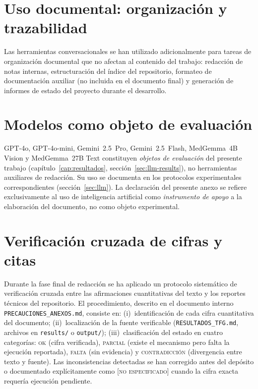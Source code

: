 \section{Uso documental: organización y trazabilidad}
\label{sec:anexod-documental}

Las herramientas conversacionales se han utilizado adicionalmente
para tareas de organización documental que no afectan al contenido
del trabajo: redacción de notas internas, estructuración del
índice del repositorio, formateo de documentación auxiliar
(no incluida en el documento final) y generación de informes de
estado del proyecto durante el desarrollo.

\section{Modelos como objeto de evaluación}
\label{sec:anexod-objeto}

GPT-4o, GPT-4o-mini, Gemini~2.5~Pro, Gemini~2.5~Flash,
MedGemma~4B Vision y MedGemma~27B Text constituyen
\emph{objetos de evaluación} del presente trabajo
(capítulo~\ref{cap:resultados}, secci\'on~\ref{sec:llm-results}), no
herramientas auxiliares de redacción. Su uso se documenta en los
protocolos experimentales correspondientes
(secci\'on~\ref{sec:llm}). La declaración del presente anexo se refiere
exclusivamente al uso de inteligencia artificial como
\emph{instrumento de apoyo} a la elaboración del documento, no
como objeto experimental.

\section{Verificación cruzada de cifras y citas}
\label{sec:anexod-verificacion}

Durante la fase final de redacción se ha aplicado un protocolo
sistemático de verificación cruzada entre las afirmaciones
cuantitativas del texto y los reportes técnicos del repositorio.
El procedimiento, descrito en el documento interno
\texttt{PRECAUCIONES\_ANEXOS.md}, consiste en: (i)~identificación
de cada cifra cuantitativa del documento;
(ii)~localización de la fuente verificable
(\texttt{RESULTADOS\_TFG.md}, archivos en \texttt{results/} o
\texttt{output/}); (iii)~clasificación del estado en cuatro
categorías: \textsc{ok} (cifra verificada), \textsc{parcial}
(existe el mecanismo pero falta la ejecución reportada),
\textsc{falta} (sin evidencia) y \textsc{contradicción}
(divergencia entre texto y fuente). Las inconsistencias detectadas
se han corregido antes del depósito o documentado explícitamente
como \textsc{[no especificado]} cuando la cifra exacta requería
ejecución pendiente.

